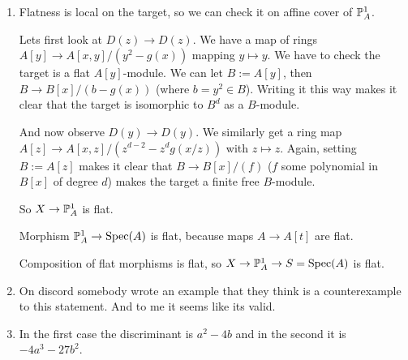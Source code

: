 \newcommand{\sheet}{5}




\maketitle{}

\begin{exercise}{1}
    \begin{enumerate}
        \item{
                Flatness is local on the target, so we can check it on affine
                cover of $\mathbb{P}^1_A$.

                Lets first look at $D(z) \to D(z)$.
                We have a map of rings $A[y] \to A[x, y]/(y^2 - g(x))$ mapping
                $y \mapsto y$. We have to check the target is a flat
                $A[y]$-module. We can let $B := A[y]$, then $B \to B[x]/(b -
                g(x))$ (where $b = y^2 \in B$). Writing it this way makes it
                clear that the target is isomorphic to $B^d$ as a $B$-module.

                And now observe $D(y) \to D(y)$.
                We similarly get a ring map $A[z] \to A[x, z]/(z^{d-2} - z^d
                g(x/z))$ with $z \mapsto z$. Again, setting $B := A[z]$ makes it
                clear that $B \to B[x]/(f)$ ($f$ some polynomial in $B[x]$ of
                degree $d$) makes the target a finite free $B$-module.

                So $X \to \mathbb{P}^1_A$ is flat.

                Morphism $\mathbb{P}^1_A \to \operatorname{Spec}(A)$ is flat, because maps $A \to
                A[t]$ are flat.

                Composition of flat morphisms is flat, so $X \to \mathbb{P}^1_A \to
                S = \operatorname{Spec}(A)$ is flat.
            }
        \item{
                On discord somebody wrote an example that they think is a
                counterexample to this statement.
                And to me it seems like its valid.
            }
        \item{
                In the first case the discriminant is $a^2 - 4b$ and in the
                second it is $-4a^3 - 27b^2$.
            }
    \end{enumerate}
\end{exercise}

